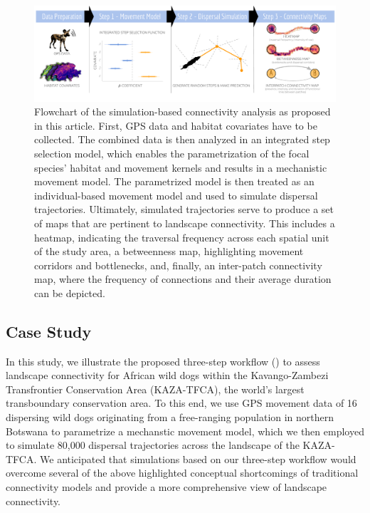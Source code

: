 \documentclass[abstract=on,10pt,a4paper,bibliography=totocnumbered]{article}
\begin{document}
\begin{figure}[htbp]
  \begin{center}
    \includegraphics[width = \textwidth]{99_GraphicalAbstract2.pdf}
    \caption{Flowchart of the simulation-based connectivity analysis as proposed
    in this article. First, GPS data and habitat covariates have to be
    collected. The combined data is then analyzed in an integrated step
    selection model, which enables the parametrization of the focal species'
    habitat and movement kernels and results in a mechanistic movement model.
    The parametrized model is then treated as an individual-based movement model
    and used to simulate dispersal trajectories. Ultimately, simulated
    trajectories serve to produce a set of maps that are pertinent to landscape
    connectivity. This includes a heatmap, indicating the traversal frequency
    across each spatial unit of the study area, a betweenness map, highlighting
    movement corridors and bottlenecks, and, finally, an inter-patch
    connectivity map, where the frequency of connections and their average
    duration can be depicted.}
    \label{GraphicalAbstract}
  \end{center}
\end{figure}

\subsection{Case Study}
In this study, we illustrate the proposed three-step workflow
() to assess landscape connectivity for African wild
dogs within the Kavango-Zambezi Transfrontier Conservation Area (KAZA-TFCA), the
world's largest transboundary conservation area. To this end, we use GPS
movement data of 16 dispersing wild dogs originating from a free-ranging
population in northern Botswana to parametrize a mechanstic movement model,
which we then employed to simulate 80,000 dispersal trajectories across the
landscape of the KAZA-TFCA. We anticipated that simulations based on our
three-step workflow would overcome several of the above highlighted conceptual
shortcomings of traditional connectivity models and provide a more comprehensive
view of landscape connectivity.
\end{document}
